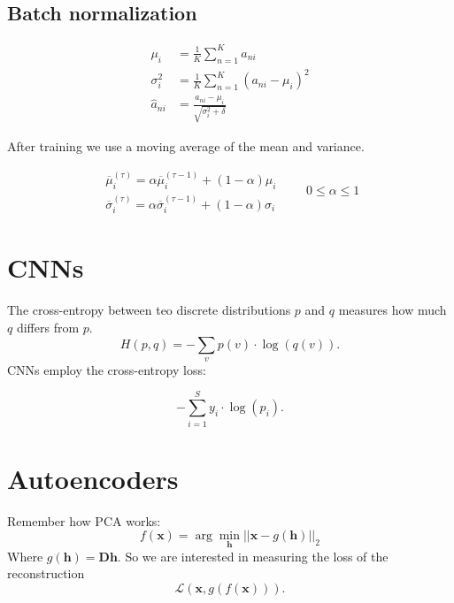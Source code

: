 \documentclass[a4paper,9pt]{extarticle}
\begin{document}
\begin{multicols*}{2}
		\subsection{Batch normalization}
		\begin{riquadro}
			\begin{align*}
				\mu_{i}&=\frac{1}{K}\sum_{n=1}^{K}a_{ni}\\
				\sigma^{2}_{i}&=\frac{1}{K}\sum_{n=1}^{K}(a_{ni}-\mu_{i})^{2}\\
				\hat{a}_{ni}&=\frac{a_{ni}-\mu_{i}}{\sqrt{\sigma_{i}^{2}+\delta}}
			\end{align*}
		\end{riquadro}
		After training we use a moving average of the mean and variance.
		\begin{riquadro}
		\begin{equation*}
				\begin{array}{c}
				\overline{\mu}_{i}^{(\tau)}=\alpha\overline{\mu}_{i}^{(\tau-1)}+(1-\alpha)\mu_{i}\\
				\overline{\sigma}_{i}^{(\tau)}=\alpha\overline{\sigma}_{i}^{(\tau-1)}+(1-\alpha)\sigma_{i}
			\end{array}\qquad0\leqslant\alpha\leqslant1
		\end{equation*}
		\end{riquadro}
		\section{CNNs}
		The cross-entropy between teo discrete distributions $p$ and $q$ measures how much $q$ differs from $p$.
		\begin{equation*}
			H(p,q)=-\sum_{v}p(v)\cdot\log(q(v)).
		\end{equation*}
		CNNs employ the cross-entropy loss:
		\begin{riquadro}
			\begin{equation*}
				-\sum_{i=1}^{S}y_{i}\cdot\log(p_{i}).
			\end{equation*}
		\end{riquadro}
		\section{Autoencoders}
		Remember how PCA works:
		\begin{equation*}
			f(\mathbf{x})=\arg\min_{\mathbf{h}}||\mathbf{x}-g(\mathbf{h})||_{2}
		\end{equation*}
		Where $g(\mathbf{h})=\mathbf{D}\mathbf{h}$.
			So we are interested in measuring the loss of the reconstruction
		\begin{equation*}
			\mathcal{L}(\mathbf{x},g(f(\mathbf{x}))).
		\end{equation*}

\end{multicols*}
\end{document}
